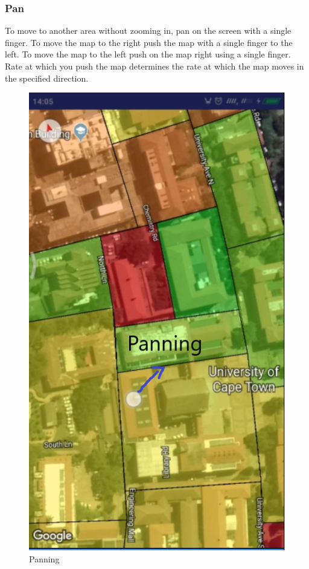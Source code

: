 \subsubsection{Pan}
To move to another area without zooming in, pan on the screen with a single finger. To move the map to the right push the map with a single finger to the left. To move the map to the left push on the map right using a single finger. Rate at which you push the map determines the rate at which the map moves in the specified direction.
\begin{figure}
	\centering
	\includegraphics[width=0.7\linewidth]{images_manual/panning}
	\caption{Panning}
	\label{fig:panning}
\end{figure}


